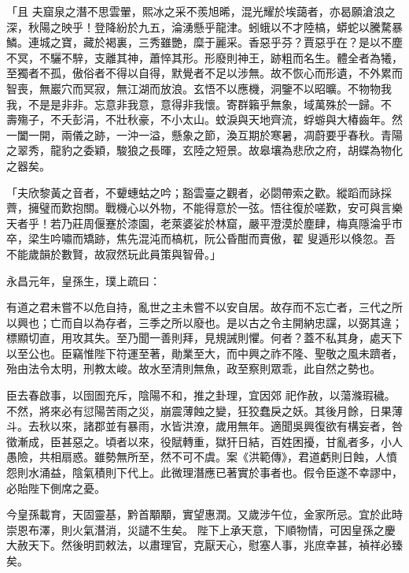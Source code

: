 \begin{pinyinscope}
 「且
 夫窟泉之潛不思雲翬，熙冰之采不羨旭晞，混光耀於埃藹者，亦曷願滄浪之深，秋陽之映乎！登降紛於九五，淪湧懸乎龍津。蚓蛾以不才陸槁，蟒蛇以騰騖暴鱗。連城之寶，藏於褐裏，三秀雖艷，糜于麗采。香惡乎芬？賈惡乎在？是以不塵不冥，不驪不騂，支離其神，蕭悴其形。形廢則神王，跡粗而名生。體全者為犧，至獨者不孤，傲俗者不得以自得，默覺者不足以涉無。故不恢心而形遺，不外累而智喪，無巖穴而冥寂，無江湖而放浪。玄悟不以應機，洞鑒不以昭曠。不物物我我，不是是非非。忘意非我意，意得非我懷。寄群籟乎無象，域萬殊於一歸。不
 壽殤子，不夭彭涓，不壯秋豪，不小太山。蚊淚與天地齊流，蜉蝣與大椿齒年。然一闔一開，兩儀之跡，一沖一溢，懸象之節，渙互期於寒暑，凋蔚要乎春秋。青陽之翠秀，龍豹之委穎，駿狼之長暉，玄陸之短景。故皋壤為悲欣之府，胡蝶為物化之器矣。



 「夫欣黎黃之音者，不顰蟪蛄之吟；豁雲臺之觀者，必閟帶索之歡。縱蹈而詠採薺，擁璧而歎抱關。戰機心以外物，不能得意於一弦。悟往復於嗟歎，安可與言樂天者乎！若乃莊周偃蹇於漆園，老萊婆娑於林窟，嚴平澄漠於塵肆，梅真隱淪乎市卒，梁生吟嘯而矯跡，焦先混沌而槁杌，阮公昏酣而賣傲，翟
 叟遁形以倏忽。吾不能歲韻於數賢，故寂然玩此員策與智骨。」



 永昌元年，皇孫生，璞上疏曰：



 有道之君未嘗不以危自持，亂世之主未嘗不以安自居。故存而不忘亡者，三代之所以興也；亡而自以為存者，三季之所以廢也。是以古之令主開納忠讜，以弼其違；標顯切直，用攻其失。至乃聞一善則拜，見規誡則懼。何者？蓋不私其身，處天下以至公也。臣竊惟陛下符運至著，勛業至大，而中興之祚不隆、聖敬之風未躋者，殆由法令太明，刑教太峻。故水至清則無魚，政至察則眾乖，此自然之勢也。



 臣去春啟事，以囹圄充斥，陰陽不和，推之卦理，宜因郊
 祀作赦，以蕩滌瑕穢。不然，將來必有愆陽苦雨之災，崩震薄蝕之變，狂狡蠢戾之妖。其後月餘，日果薄斗。去秋以來，諸郡並有暴雨，水皆洪潦，歲用無年。適聞吳興復欲有構妄者，咎徵漸成，臣甚惡之。頃者以來，役賦轉重，獄犴日結，百姓困擾，甘亂者多，小人愚險，共相扇惑。雖勢無所至，然不可不虞。案《洪範傳》，君道虧則日蝕，人憤怨則水涌益，陰氣積則下代上。此微理潛應已著實於事者也。假令臣遂不幸謬中，必貽陛下側席之憂。



 今皇孫載育，天固靈基，黔首顒顒，實望惠潤。又歲涉午位，金家所忌。宜於此時崇恩布澤，則火氣潛消，災譴不生矣。
 陛下上承天意，下順物情，可因皇孫之慶大赦天下。然後明罰敕法，以肅理官，克厭天心，慰塞人事，兆庶幸甚，禎祥必臻矣。




\end{pinyinscope}
